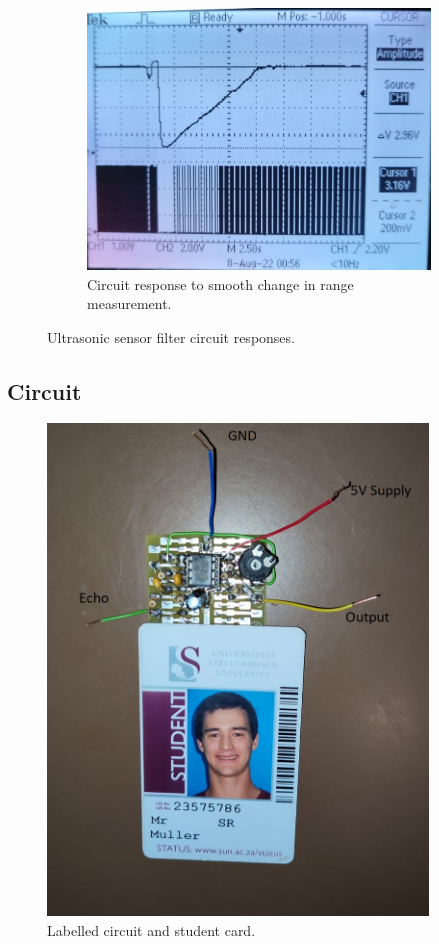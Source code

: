 \begin{figure}[H]
\begin{subfigure}[]{0.45\textwidth}
\includegraphics[width=\linewidth]{./Figures/SonicSens_Prac_Range.jpeg}
\caption{Circuit response to smooth change in range measurement.}
\label{subfig:sonicsen_prac_range}	
\end{subfigure}
\caption{Ultrasonic sensor filter circuit responses.}
\label{fig:sonicsen_prac}
\end{figure}

\newpage
\subsection{Circuit}
\begin{figure}[H]
\centering
\includegraphics[width = 0.9\textwidth]{./Figures/SonicSens_Cir_Card.jpeg}
\caption{Labelled circuit and student card.}
\label{fig:sonicsen_cir_card}
\end{figure}

